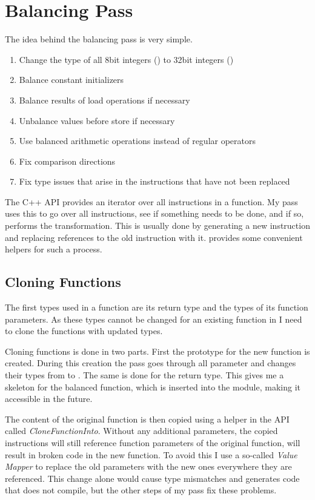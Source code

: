 \section{Balancing Pass}
\label{pass}
The idea behind the balancing pass is very simple.
\begin{enumerate}
\item Change the type of all 8bit integers () to 32bit integers ()
\item Balance constant initializers
\item Balance results of load operations if necessary
\item Unbalance values before store if necessary
\item Use balanced arithmetic operations instead of regular operators
\item Fix comparison directions
\item Fix type issues that arise in the instructions that have not been replaced
\end{enumerate}

The \llvm{} C++ API provides an iterator over all instructions in a function.
My pass uses this to go over all instructions, see if something needs to be done, and if so, performs the transformation.
This is usually done by generating a new \ir{} instruction and replacing references to the old instruction with it.
\llvm{} provides some convenient helpers for such a process.

\subsection{Cloning Functions}
The first types used in a function are its return type and the types of its function parameters.
As these types cannot be changed for an existing function in \llvm{} I need to clone the functions with updated types.

Cloning functions is done in two parts.
First the prototype for the new function is created.
During this creation the pass goes through all parameter and changes their types from  to .
The same is done for the return type.
This gives me a skeleton for the balanced function, which is inserted into the module, making it accessible in the future.

The content of the original function is then copied using a helper in the \llvm{} API called \emph{CloneFunctionInto}.
Without any additional parameters, the copied instructions will still reference function parameters of the original function, will result in broken code in the new function.
To avoid this I use a so-called \emph{Value Mapper} to replace the old parameters with the new ones everywhere they are referenced.
This change alone would cause type mismatches and generates code that does not compile, but the other steps of my pass fix these problems.

